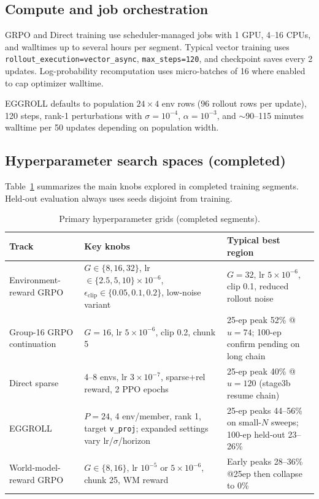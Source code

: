 \subsection{Compute and job orchestration}
GRPO and Direct training use scheduler-managed jobs with 1 GPU, 4--16 CPUs, and walltimes up to several hours per segment. Typical vector training uses \texttt{rollout\_execution=vector\_async}, \texttt{max\_steps=120}, and checkpoint saves every 2 updates. Log-probability recomputation uses micro-batches of 16 where enabled to cap optimizer walltime.

EGGROLL defaults to population $24 \times 4$ env rows ($96$ rollout rows per update), 120 steps, rank-1 perturbations with $\sigma=10^{-4}$, $\alpha=10^{-3}$, and $\sim$90--115 minutes walltime per 50 updates depending on population width.

\subsection{Hyperparameter search spaces (completed)}
Table~\ref{tab:method-hparam-grid} summarizes the main knobs explored in completed training segments. Held-out evaluation always uses seeds disjoint from training.

\begin{table}[H]
\centering
\caption{Primary hyperparameter grids (completed segments).}
\label{tab:method-hparam-grid}
\small
\setlength{\tabcolsep}{4pt}
\begin{tabularx}{\linewidth}{@{}l X X@{}}
\toprule
Track & Key knobs & Typical best region \\
\midrule
Environment-reward GRPO & $G\in\{8,16,32\}$, lr $\in\{2.5,5,10\}\times10^{-6}$, $\epsilon_{\mathrm{clip}}\in\{0.05,0.1,0.2\}$, low-noise variant & $G{=}32$, lr $5{\times}10^{-6}$, clip 0.1, reduced rollout noise \\
Group-16 GRPO continuation & $G{=}16$, lr $5{\times}10^{-6}$, clip 0.2, chunk 5 & 25-ep peak 52\% @ $u{=}74$; 100-ep confirm pending on long chain \\
Direct sparse & 4--8 envs, lr $3{\times}10^{-7}$, sparse+rel reward, 2 PPO epochs & 25-ep peak 40\% @ $u{=}120$ (stage3b resume chain) \\
EGGROLL & $P{=}24$, 4 env/member, rank 1, target \texttt{v\_proj}; expanded settings vary lr/$\sigma$/horizon & 25-ep peaks 44--56\% on small-$N$ sweeps; 100-ep held-out 23--26\% \\
World-model-reward GRPO & $G\in\{8,16\}$, lr $10^{-5}$ or $5{\times}10^{-6}$, chunk 25, WM reward & Early peaks 28--36\% @25ep then collapse to 0\% \\
\bottomrule
\end{tabularx}
\end{table}

